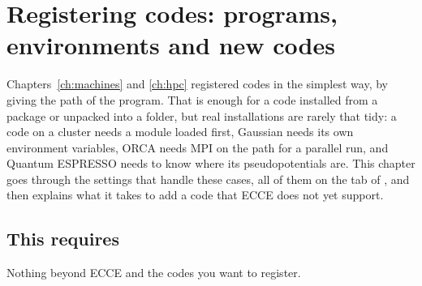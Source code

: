 \chapter{Registering codes: programs, environments and new codes}
\label{ch:code-registration}

Chapters~\ref{ch:machines} and \ref{ch:hpc} registered codes in the simplest way, by giving the path of the program. That is enough for a code installed from a package or unpacked into a folder, but real installations are rarely that tidy: a code on a cluster needs a module loaded first, Gaussian needs its own environment variables, ORCA needs MPI on the path for a parallel run, and Quantum ESPRESSO needs to know where its pseudopotentials are. This chapter goes through the settings that handle these cases, all of them on the  tab of , and then explains what it takes to add a code that ECCE does not yet support.

\section*{This requires}
Nothing beyond ECCE and the codes you want to register.

